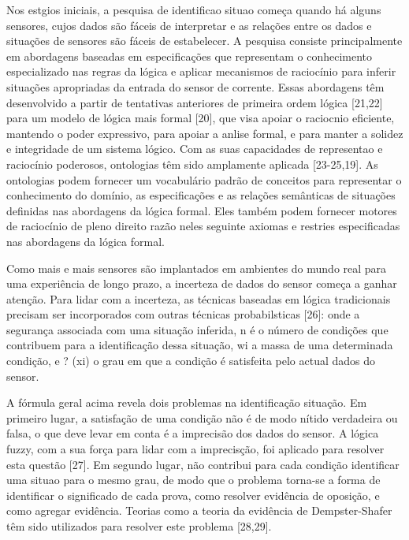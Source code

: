 \documentclass[12pt,a4paper,compsoc]{IEEEtran}
\begin{document}
Nos estgios iniciais, a pesquisa de identificao situao começa quando há alguns sensores, cujos dados são fáceis de interpretar e as relações entre os dados e situações de sensores são fáceis de estabelecer. A pesquisa consiste principalmente em abordagens baseadas em especificações que representam o conhecimento especializado nas regras da lógica e aplicar mecanismos de raciocínio para inferir situações apropriadas da entrada do sensor de corrente. Essas abordagens têm desenvolvido a partir de tentativas anteriores de primeira ordem lógica [21,22] para um modelo de lógica mais formal [20], que visa apoiar o raciocnio eficiente, mantendo o poder expressivo, para apoiar a anlise formal, e para manter a solidez e integridade de um sistema lógico. Com as suas capacidades de representao e raciocínio poderosos, ontologias têm sido amplamente aplicada [23-25,19]. As ontologias podem fornecer um vocabulário padrão de conceitos para representar o conhecimento do domínio, as especificações e as relações semânticas de situações definidas nas abordagens da lógica formal. Eles também podem fornecer motores de raciocínio de pleno direito  razão neles seguinte axiomas e restries especificadas nas abordagens da lógica formal.

Como mais e mais sensores são implantados em ambientes do mundo real para uma experiência de longo prazo, a incerteza de dados do sensor começa a ganhar atenção. Para lidar com a incerteza, as técnicas baseadas em lógica tradicionais precisam ser incorporados com outras técnicas probabilsticas [26]: onde a segurança associada com uma situação inferida, n é o número de condições que contribuem para a identificação dessa situação, wi  a massa de uma determinada condição, e ? (xi)  o grau em que a condição é satisfeita pelo actual dados do sensor.

A fórmula geral acima revela dois problemas na identificação situação. Em primeiro lugar, a satisfação de uma condição não é de modo nítido verdadeira ou falsa, o que deve levar em conta é a imprecisão dos dados do sensor. A lógica fuzzy, com a sua força para lidar com a imprecisção, foi aplicado para resolver esta questão [27]. Em segundo lugar, não contribui para cada condição identificar uma situao para o mesmo grau, de modo que o problema torna-se a forma de identificar o significado de cada prova, como resolver evidência de oposição, e como agregar evidência. Teorias como a teoria da evidência de Dempster-Shafer têm sido utilizados para resolver este problema [28,29].

\end{document}
